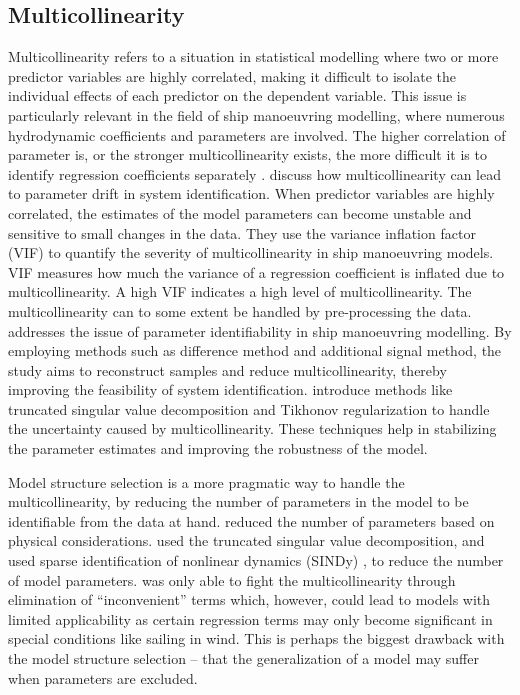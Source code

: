 \subsection{Multicollinearity}
Multicollinearity refers to a situation in statistical modelling where two or more predictor variables are highly correlated, making it difficult to isolate the individual effects of each predictor on the dependent variable. This issue is particularly relevant in the field of ship manoeuvring modelling, where numerous hydrodynamic coefficients and parameters are involved.
The higher correlation of parameter is, or the stronger multicollinearity exists, the more difficult it is to identify regression coefficients separately \cite{yoonIdentificationHydrodynamicCoefficients2003}.
\cite{wangQuantifyingMulticollinearityShip2018} discuss how multicollinearity can lead to parameter drift in system identification. When predictor variables are highly correlated, the estimates of the model parameters can become unstable and sensitive to small changes in the data. They use the variance inflation factor (VIF) to quantify the severity of multicollinearity in ship manoeuvring models. VIF measures how much the variance of a regression coefficient is inflated due to multicollinearity. A high VIF indicates a high level of multicollinearity.
The multicollinearity can to some extent be handled by pre-processing the data.
\cite{luoParameterIdentificationShip2016} addresses the issue of parameter identifiability in ship manoeuvring modelling. By employing methods such as difference method and additional signal method, the study aims to reconstruct samples and reduce multicollinearity, thereby improving the feasibility of system identification.
\cite{xuUncertaintyAnalysisHydrodynamic2019} introduce methods like truncated singular value decomposition and Tikhonov regularization to handle the uncertainty caused by multicollinearity. These techniques help in stabilizing the parameter estimates and improving the robustness of the model.

Model structure selection is a more pragmatic way to handle the multicollinearity, by reducing the number of parameters in the model to be identifiable from the data at hand.  \cite{luoParameterIdentificationShip2016} reduced the number of parameters based on physical considerations. \cite{costaRobustParameterEstimation2021} used the truncated singular value decomposition, and \cite{liuPhysicsinformedIdentificationMarine2024} used sparse identification of nonlinear dynamics (SINDy) \cite{bruntonDiscoveringGoverningEquations2016}, to reduce the number of model parameters. 
\cite{abkowitzMEASUREMENTHYDRODYNAMICCHARACTERISTICS1980} was only able to fight the multicollinearity through elimination of “inconvenient” terms which, however, could lead to models with limited applicability as certain regression terms may only become significant in special conditions like sailing in wind. This is perhaps the biggest drawback with the model structure selection – that the generalization of a model may suffer when parameters are excluded.

